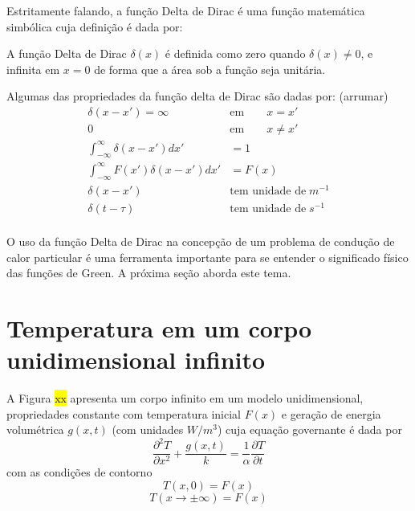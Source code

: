 Estritamente falando, a função Delta de Dirac é uma função matemática simbólica cuja definição é dada por:

A função Delta de Dirac $\delta (x)$ é definida como zero quando $\delta (x)\neq 0$, e infinita em $x = 0$ de forma que a área sob a função seja unitária.

Algumas das propriedades da função delta de Dirac são dadas por: (arrumar)
\begin{equation*}
    \begin{split}
        \delta(x-x') =  \infty  \qquad & \text{em}  \qquad x = x' \\
        0 \qquad  & \text{em}  \qquad x \neq x'\\ 
        \displaystyle \int_{-\infty}^{\infty} \delta(x-x') dx' & =  1 \\  
        \displaystyle \int_{-\infty}^{\infty} F(x') \delta(x-x') dx' & = F(x) \\  
        \delta(x-x') \qquad & \text{tem unidade de} \; m^{-1} \\ 
        \delta(t-\tau) \qquad & \text{tem unidade de} \; s^{-1} \\
    \end{split}
\end{equation*}

O uso da função Delta de Dirac na concepção de um problema de condução de calor particular é uma ferramenta importante para se entender o significado físico das funções de Green.  A próxima seção aborda este tema.

\section{Temperatura em um corpo unidimensional infinito}
A Figura \hl{xx} apresenta um corpo infinito em um modelo unidimensional, propriedades constante com temperatura inicial $F(x)$ e geração de energia volumétrica $g(x,t)$ (com unidades $W/m^3$) cuja equação governante é dada por
\begin{equation}\label{eq1Da}
    \frac{\partial^2 T}{\partial x^2} + \frac{g(x,t)}{k}  
    = \frac{1}{\alpha}\frac{\partial T}{\partial t}  
\end{equation}
com as condições de contorno 
\begin{equation}\label{eq1Db}
    T(x,0) = F(x)
\end{equation}
\begin{equation}\label{eq1Dc}
    T(x\rightarrow  \pm \infty) = F(x)
\end{equation}

